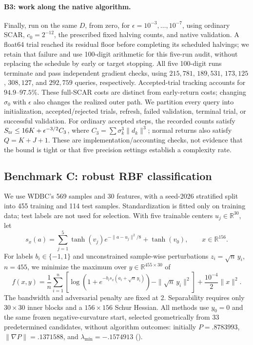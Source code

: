 \paragraph{B3: work along the native algorithm.}
Finally, run  on the same $D$, from zero,
for $\epsilon=10^{-3},\ldots,10^{-7}$, using ordinary SCAR,
$c_0=2^{-12}$, the prescribed fixed halving counts, and native validation.
A float64 trial reached its residual floor before completing its scheduled
halvings; we retain that failure and use 100-digit arithmetic for this
five-run audit, without replacing the schedule by early or target stopping.
All five 100-digit runs terminate and pass independent gradient checks,
using $215{,}781$, $189{,}531$, $173{,}125$, $308{,}127$, and $292{,}759$
queries, respectively. Accepted-trial tracking accounts for $94.9$--$97.5\%$.
These full-SCAR costs are distinct from early-return costs; changing
$\sigma_0$ with $\epsilon$ also changes the realized outer path.
We partition every query into initialization, accepted/rejected trials,
refresh, failed validation, terminal trial, or successful validation.
For ordinary accepted steps, the recorded counts satisfy
$S_{\rm tr}\le16K+\epsilon^{-3/2}C_3$, where
$C_3=\sum\sigma_k^3\|d_k\|^3$; normal returns also satisfy $Q=K+J+1$.
These are implementation/accounting checks, not evidence that the bound
is tight or that five precision settings establish a complexity rate.

\subsection{Benchmark C: robust RBF classification}
\label{sec:exp-c}

We use WDBC's 569 samples and 30 features, with a seed-2026 stratified
split into 455 training and 114 test samples. Standardization is fitted
only on training data; test labels are not used for selection.
With five trainable centers $u_j\in\mathbb R^{30}$, let
\[
 s_x(a)=\sum_{j=1}^5\tanh(v_j)e^{-\|a-u_j\|^2/8}+\tanh(v_0),
 \qquad x\in\mathbb R^{156}.
\]
For labels $b_i\in\{-1,1\}$ and unconstrained sample-wise perturbations
$z_i=\sqrt n\,y_i$, $n=455$, we minimize the maximum over
$y\in\mathbb R^{455\times30}$ of
\begin{equation}
 f(x,y)=\frac1n\sum_{i=1}^n
 \left[\log(1+e^{-b_i s_x(a_i+\sqrt n\,y_i)})
                  -\|\sqrt n\,y_i\|^2\right]
                  +\frac{10^{-4}}2\|x\|^2.
 \label{eq:exp-c-payoff}
\end{equation}
The bandwidth and adversarial penalty are fixed at 2. Separability
requires only $30\times30$ inner blocks and a $156\times156$ Schur
Hessian. All methods use $y_0=0$ and the same frozen negative-curvature
start, selected geometrically from 33 predetermined candidates, without
algorithm outcomes: initially $P=.8783993$, $\|\nabla P\|=.1371588$,
and $\lambda_{\min}=-.1574913$ ().

